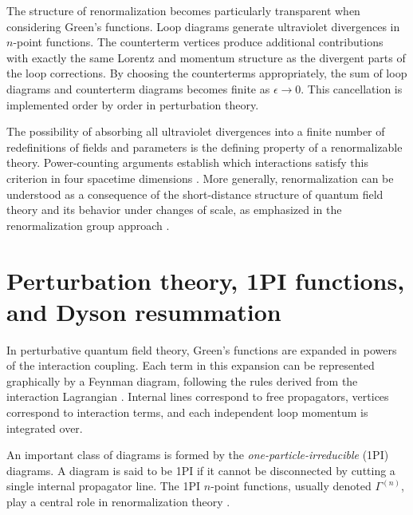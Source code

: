 The structure of renormalization becomes particularly transparent when
considering Green’s functions.
Loop diagrams generate ultraviolet divergences in $n$-point functions.
The counterterm vertices produce additional contributions with exactly
the same Lorentz and momentum structure as the divergent parts of the
loop corrections.
By choosing the counterterms appropriately, the sum of loop diagrams and
counterterm diagrams becomes finite as $\epsilon \to 0$.
This cancellation is implemented order by order in perturbation theory.

The possibility of absorbing all ultraviolet divergences into a finite
number of redefinitions of fields and parameters is the defining property
of a renormalizable theory.
Power-counting arguments establish which interactions satisfy this
criterion in four spacetime dimensions
\cite{WeinbergQFT}.
More generally, renormalization can be understood as a consequence of
the short-distance structure of quantum field theory and its behavior
under changes of scale, as emphasized in the renormalization group
approach \cite{GellMannLow1954,Wilson1971}.

\section*{Perturbation theory, 1PI functions, and Dyson resummation}

In perturbative quantum field theory, Green's functions are expanded
in powers of the interaction coupling.
Each term in this expansion can be represented graphically by a
Feynman diagram, following the rules derived from the interaction
Lagrangian \cite{Feynman1949,PeskinSchroeder1995,WeinbergQFT}.
Internal lines correspond to free propagators, vertices correspond
to interaction terms, and each independent loop momentum is integrated
over.

An important class of diagrams is formed by the
\emph{one-particle-irreducible} (1PI) diagrams.
A diagram is said to be 1PI if it cannot be disconnected by cutting
a single internal propagator line.
The 1PI $n$-point functions, usually denoted
$\Gamma^{(n)}$, play a central role in renormalization theory
\cite{WeinbergQFT}.


